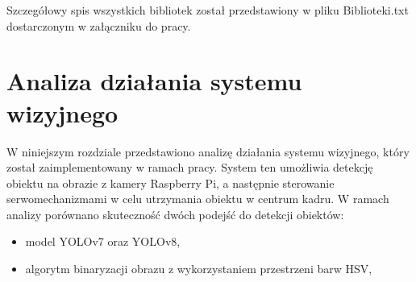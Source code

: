 \documentclass[a4paper,twoside,12pt]{book}
\begin{document}
Szczegółowy spis wszystkich bibliotek został przedstawiony w pliku Biblioteki.txt dostarczonym w załączniku do pracy.









%      


\chapter{Analiza działania systemu wizyjnego}
\label{ch:05}
W niniejszym rozdziale przedstawiono analizę działania systemu wizyjnego, który został zaimplementowany w ramach pracy. System ten umożliwia detekcję obiektu na obrazie z kamery Raspberry Pi, a następnie sterowanie serwomechanizmami w celu utrzymania obiektu w centrum kadru. W ramach analizy porównano skuteczność dwóch podejść do detekcji obiektów: 
\begin{itemize}
    \item model YOLOv7 oraz YOLOv8,
    \item algorytm binaryzacji obrazu z wykorzystaniem przestrzeni barw HSV,
\end{itemize}
\end{document}

